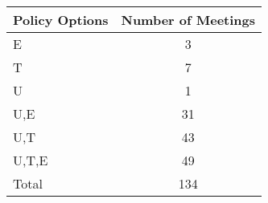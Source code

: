\begin{tabular}{lc}
\hline\hline 
\addlinespace 
Policy Options & Number of Meetings \\ 
\hline 
E & 3 \\
T & 7 \\
U & 1 \\
U,E & 31 \\
U,T & 43 \\
U,T,E & 49 \\
\addlinespace 
Total & 134 \\
\hline 
\end{tabular}
